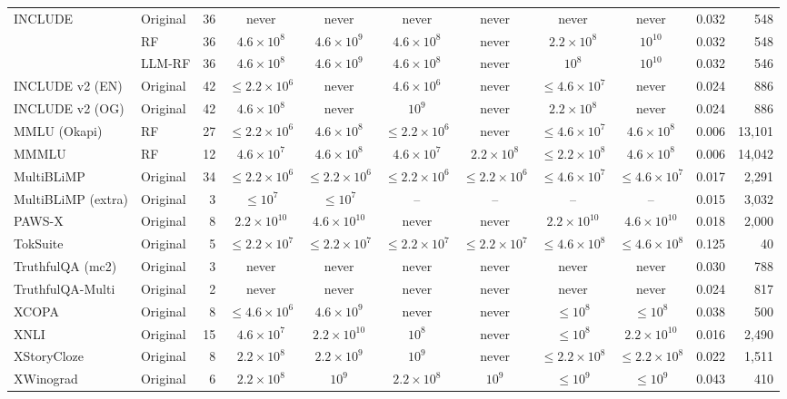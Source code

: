 \begin{tabular}{llrccccccrr}
\addlinespace
INCLUDE & Original & 36 & never & never & never & never & never & never & 0.032 & 548 \\
 & RF & 36 & $4.6\times10^{8}$ & $4.6\times10^{9}$ & $4.6\times10^{8}$ & never & $2.2\times10^{8}$ & $10^{10}$ & 0.032 & 548 \\
 & LLM-RF & 36 & $4.6\times10^{8}$ & $4.6\times10^{9}$ & $4.6\times10^{8}$ & never & $10^{8}$ & $10^{10}$ & 0.032 & 546 \\
\addlinespace
INCLUDE v2 (EN) & Original & 42 & $\leq 2.2\times10^{6}$ & never & $4.6\times10^{6}$ & never & $\leq 4.6\times10^{7}$ & never & 0.024 & 886 \\
\addlinespace
INCLUDE v2 (OG) & Original & 42 & $4.6\times10^{8}$ & never & $10^{9}$ & never & $2.2\times10^{8}$ & never & 0.024 & 886 \\
\addlinespace
MMLU (Okapi) & RF & 27 & $\leq 2.2\times10^{6}$ & $4.6\times10^{8}$ & $\leq 2.2\times10^{6}$ & never & $\leq 4.6\times10^{7}$ & $4.6\times10^{8}$ & 0.006 & 13{,}101 \\
\addlinespace
MMMLU & RF & 12 & $4.6\times10^{7}$ & $4.6\times10^{8}$ & $4.6\times10^{7}$ & $2.2\times10^{8}$ & $\leq 2.2\times10^{8}$ & $4.6\times10^{8}$ & 0.006 & 14{,}042 \\
\addlinespace
MultiBLiMP & Original & 34 & $\leq 2.2\times10^{6}$ & $\leq 2.2\times10^{6}$ & $\leq 2.2\times10^{6}$ & $\leq 2.2\times10^{6}$ & $\leq 4.6\times10^{7}$ & $\leq 4.6\times10^{7}$ & 0.017 & 2{,}291 \\
\addlinespace
MultiBLiMP (extra) & Original & 3 & $\leq 10^{7}$ & $\leq 10^{7}$ & -- & -- & -- & -- & 0.015 & 3{,}032 \\
\addlinespace
PAWS-X & Original & 8 & $2.2\times10^{10}$ & $4.6\times10^{10}$ & never & never & $2.2\times10^{10}$ & $4.6\times10^{10}$ & 0.018 & 2{,}000 \\
\addlinespace
TokSuite & Original & 5 & $\leq 2.2\times10^{7}$ & $\leq 2.2\times10^{7}$ & $\leq 2.2\times10^{7}$ & $\leq 2.2\times10^{7}$ & $\leq 4.6\times10^{8}$ & $\leq 4.6\times10^{8}$ & 0.125 & 40 \\
\addlinespace
TruthfulQA (mc2) & Original & 3 & never & never & never & never & never & never & 0.030 & 788 \\
\addlinespace
TruthfulQA-Multi & Original & 2 & never & never & never & never & never & never & 0.024 & 817 \\
\addlinespace
XCOPA & Original & 8 & $\leq 4.6\times10^{6}$ & $4.6\times10^{9}$ & never & never & $\leq 10^{8}$ & $\leq 10^{8}$ & 0.038 & 500 \\
\addlinespace
XNLI & Original & 15 & $4.6\times10^{7}$ & $2.2\times10^{10}$ & $10^{8}$ & never & $\leq 10^{8}$ & $2.2\times10^{10}$ & 0.016 & 2{,}490 \\
\addlinespace
XStoryCloze & Original & 8 & $2.2\times10^{8}$ & $2.2\times10^{9}$ & $10^{9}$ & never & $\leq 2.2\times10^{8}$ & $\leq 2.2\times10^{8}$ & 0.022 & 1{,}511 \\
\addlinespace
XWinograd & Original & 6 & $2.2\times10^{8}$ & $10^{9}$ & $2.2\times10^{8}$ & $10^{9}$ & $\leq 10^{9}$ & $\leq 10^{9}$ & 0.043 & 410 \\
\bottomrule
\end{tabular}
